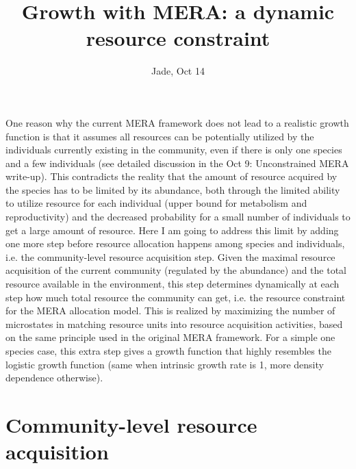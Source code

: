 \documentclass[12pt]{article}
\date{}
\title{\Large \textbf{Growth with MERA: a dynamic resource constraint}}
\author{Jade, Oct 14}
\begin{document}
\maketitle
\raggedright
\large
\setlength{\parindent}{15pt}

One reason why the current MERA framework does not lead to a realistic growth function is that it assumes all resources can be potentially utilized by the individuals currently existing in the community, even if there is only one species and a few individuals (see detailed discussion in the Oct 9: Unconstrained MERA write-up). This contradicts the reality that the amount of resource acquired by the species has to be limited by its abundance, both through the limited ability to utilize resource for each individual (upper bound for metabolism and reproductivity) and the decreased probability for a small number of individuals to get a large amount of resource. Here I am going to address this limit by adding one more step before resource allocation happens among species and individuals, i.e. the community-level resource acquisition step. Given the maximal resource acquisition of the current community (regulated by the abundance) and the total resource available in the environment, this step determines dynamically at each step how much total resource the community can get, i.e. the resource constraint for the MERA allocation model. This is realized by maximizing the number of microstates in matching resource units into resource acquisition activities, based on the same principle used in the original MERA framework. For a simple one species case, this extra step gives a growth function that highly resembles the logistic growth function (same when intrinsic growth rate is 1, more density dependence otherwise).

\section{Community-level resource acquisition}
\end{document}
